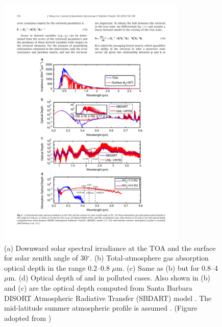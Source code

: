 \begin{figure}[p]
  \centering
  \includegraphics[width={0.8\textwidth}]{figures/unlvrtm1.pdf}
  \caption{(a) Downward solar spectral irradiance at the TOA and the
surface for solar zenith angle of 30$^\circ$. (b) Total-atmosphere gas
absorption optical depth in the range 0.2--0.8 $\mu$m. (c) Same as (b) but
for 0.8--4 $\mu$m. (d) Optical depth of  and  in
 polluted cases. Also shown in (b) and (c) are the optical depth computed 
from Santa Barbara DISORT Atmospheric Radiative Transfer (SBDART) model
\citep{Ricchiazzi98}. The mid-latitude summer atmospheric profile is 
assumed \citep{McClatchey72}. (Figure adopted from \citet{Wang14})}
  \label{fig:unlvrtm1}
\end{figure}

